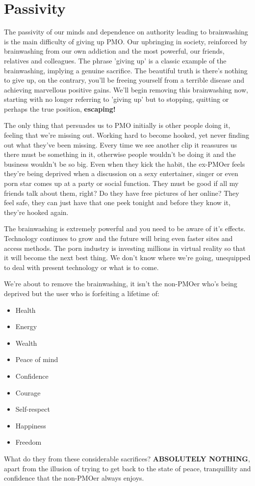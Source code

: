 \documentclass[easypeasy.tex]{subfiles}
\begin{document}
\section{Passivity}
The passivity of our minds and dependence on authority leading to brainwashing is the main difficulty of giving up PMO. Our upbringing in society, reinforced by brainwashing from our own addiction and the most powerful, our friends, relatives and colleagues. The phrase 'giving up' is a classic example of the brainwashing, implying a genuine sacrifice. The beautiful truth is there's nothing to give up, on the contrary, you'll be freeing yourself from a terrible disease and achieving marvellous positive gains. We'll begin removing this brainwashing now, starting with no longer referring to 'giving up' but to stopping, quitting or perhaps the true position, \textbf{escaping!}

The only thing that persuades us to PMO initially is other people doing it, feeling that we're missing out. Working hard to become hooked, yet never finding out what they've been missing. Every time we see another clip it reassures us there must be something in it, otherwise people wouldn't be doing it and the business wouldn't be so big. Even when they kick the habit, the ex-PMOer feels they're being deprived when a discussion on a sexy entertainer, singer or even  porn star comes up at a party or social function. They must be good if all my friends talk about them, right? Do they have free pictures of her online? They feel safe, they can just have that one peek tonight and before they know it, they're hooked again.

The brainwashing is extremely powerful and you need to be aware of it's effects. Technology continues to grow and the future will bring even faster sites and access methods. The porn industry is investing millions in virtual reality so that it will become the next best thing. We don't know where we're going, unequipped to deal with present technology or what is to come.

We're about to remove the brainwashing, it isn't the non-PMOer who's being deprived but the user who is forfeiting a lifetime of:
\begin{itemize}
  \item Health
  \item Energy
  \item Wealth
  \item Peace of mind
  \item Confidence
  \item Courage
  \item Self-respect
  \item Happiness
  \item Freedom
\end{itemize}
What do they from these considerable sacrifices? \textbf{ABSOLUTELY NOTHING}, apart from the illusion of trying to get back to the state of peace, tranquillity and confidence that the non-PMOer always enjoys.
\end{document}
